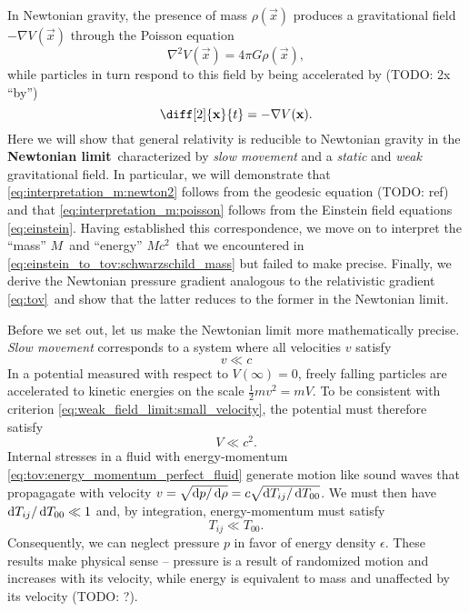 
In Newtonian gravity, the presence of mass $\rho(\vec{x})$ produces a gravitational field $-\nabla V(\vec{x})$ through the Poisson equation
\begin{equation}
	\nabla^2 V(\vec{x}) = 4 \pi G \rho(\vec{x}) ,
	\label{eq:interpretation_m:poisson}
\end{equation}
while particles in turn respond to this field by being accelerated by (TODO: 2x ``by'')
\begin{equation}
	\diff[2]{\vec{x}}{t} = - \nabla V(\vec{x}) .
	\label{eq:interpretation_m:newton2}
\end{equation}
Here we will show that general relativity is reducible to Newtonian gravity in the \textbf{Newtonian limit} characterized by \emph{slow movement} and a \emph{static} and \emph{weak} gravitational field.
In particular, we will demonstrate that \cref{eq:interpretation_m:newton2} follows from the geodesic equation (TODO: ref) and that \cref{eq:interpretation_m:poisson} follows from the Einstein field equations \eqref{eq:einstein}.
Having established this correspondence, we move on to interpret the ``mass'' $M$ and ``energy'' $Mc^2$ that we encountered in \cref{eq:einstein_to_tov:schwarzschild_mass} but failed to make precise.
Finally, we derive the Newtonian pressure gradient analogous to the relativistic gradient \eqref{eq:tov} and show that the latter reduces to the former in the Newtonian limit.

Before we set out, let us make the Newtonian limit more mathematically precise.
\emph{Slow movement} corresponds to a system where all velocities $v$ satisfy
\begin{equation}
	v \ll c
	\label{eq:weak_field_limit:small_velocity}
\end{equation}
In a potential measured with respect to $V(\infty) = 0$, freely falling particles are accelerated to kinetic energies on the scale $\frac12 m v^2 = m V$.
To be consistent with criterion \eqref{eq:weak_field_limit:small_velocity}, the potential must therefore satisfy
\begin{equation}
	V \ll c^2 .
	\label{eq:weak_field_limit:small_potential}
\end{equation}
Internal stresses in a fluid with energy-momentum \eqref{eq:tov:energy_momentum_perfect_fluid} generate motion like sound waves that propagagate with velocity $v = \sqrt{\mathop{}\!\mathrm{d} p / \mathop{}\!\mathrm{d} \rho} = c \sqrt{\mathop{}\!\mathrm{d} T_{ij} / \mathop{}\!\mathrm{d} T_{00}}$.
We must then have $\mathop{}\!\mathrm{d} T_{ij} / \mathop{}\!\mathrm{d} T_{00} \ll 1$ and, by integration, energy-momentum must satisfy
\begin{equation}
	T_{ij} \ll T_{00} .
	\label{eq:weak_field_limit:small_pressure}
\end{equation}
Consequently, we can neglect pressure $p$ in favor of energy density $\epsilon$.
These results make physical sense -- pressure is a result of randomized motion and increases with its velocity, while energy is equivalent to mass and unaffected by its velocity (TODO: ?).

